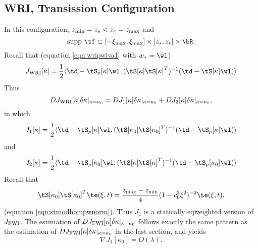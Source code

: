 \subsection{WRI, Transission Configuration}
In this configuration, $z_{\rm min}=z_s < z_r=z_{\rm max}$ and
\begin{equation}
  \label{eqn:writransupp}
  \mbox{supp }\tf \subset [-\xi_{\rm max},\xi_{\rm max}]\times
  [z_s,z_r]\times \bR.
\end{equation}
Recall that (equation \ref{eqn:wripwiva1} with $w_*=\wl$)
\begin{equation}
  \label{eqn:wripwiva1}
  J_{\rm WRI}[\kappa]   = \frac{1}{2}\langle \td -
  \tS_p[\kappa]\wl, (\tS[\kappa]\tS[\kappa]^T)^{-1}( \td -
  \tS[\kappa]\wl) \rangle  
\end{equation} 
Thus
\[
  D J_{\rm WRI}[\kappa]\delta \kappa|_{\kappa=\kappa_0}   =
  DJ_1[\kappa]\delta \kappa|_{\kappa=\kappa_0} +
  DJ_2[\kappa]\delta \kappa|_{\kappa=\kappa_0},
\]
in which
\[
  J_1[\kappa]   = \frac{1}{2}\langle \td -
  \tS_p[\kappa]\wl, (\tS[\kappa_0]\tS[\kappa_0]^T)^{-1}( \td -
  \tS_p[\kappa]\wl) \rangle 
\]
and
\[
 J_2[\kappa] =  \frac{1}{2}\langle \td -
  \tS_p[\kappa_0]\wl, (\tS[\kappa]\tS[\kappa]^T)^{-1}( \td -
  \tS_p[\kappa_0]\wl) \rangle
\]
Recall that 
\[
  \tS[\kappa_0]\tS[\kappa_0]^T\te(\xi,t) = \frac{z_{\rm max}-z_{\rm min}}{4}(1-c_0^2\xi^2)^{-2}\te(\xi,t).
\]
(equation \ref{eqn:stmodhompwnorm}). Thus $J_1$ is a statically
eqweighted version of $J_{\rm FWI}$. The estimation of $D J_{\rm
  FWI}[\kappa]\delta \kappa|_{\kappa=\kappa_0}$ follows exactly the
same pattern as the 
estimation of $D J_{\rm
  FWI}[\kappa]\delta \kappa|_{\kappa=\kappa_0}$ in the last section,
and yields
\begin{equation}
  \label{eqn:j1est}
  \nabla J_1[\kappa_0] = O(\lambda).
\end{equation}

